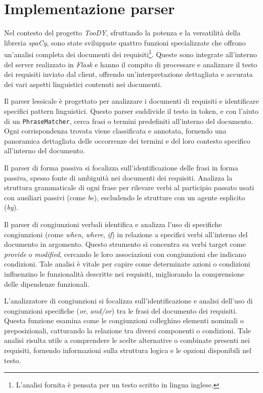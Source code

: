 \documentclass[12pt]{report}
\newcommand{\toody}{\textsl{TooDY}\xspace}
\newcommand{\flask}{\textsl{Flask}\xspace}
\newcommand{\spacy}{\textsl{spaCy}\xspace}
\begin{document}
\section{Implementazione parser}
\label{sec:parser}
Nel contesto del progetto \toody, sfruttando la potenza e la versatilità della libreria \spacy, sono state sviluppate quattro funzioni specializzate che offrono un'analisi completa dei documenti dei requisiti\footnote{L'analisi fornita è pensata per un testo scritto in lingua inglese.}. Queste sono integrate all'interno del server realizzato in \flask e hanno il compito di processare e analizzare il testo dei requisiti inviato dal client, offrendo un'interpretazione dettagliata e accurata dei vari aspetti linguistici contenuti nei documenti.

Il \textsf{parser lessicale} è progettato per analizzare i documenti di requisiti e identificare specifici pattern linguistici. Questo parser suddivide il testo in token, e con l'aiuto di un \texttt{PhraseMatcher}, cerca frasi o termini predefiniti all'interno del documento. Ogni corrispondenza trovata viene classificata e annotata, fornendo una panoramica dettagliata delle occorrenze dei termini e del loro contesto specifico all'interno del documento.

Il \textsf{parser di forma passiva} si focalizza sull'identificazione delle frasi in forma passiva, spesso fonte di ambiguità nei documenti dei requisiti. Analizza la struttura grammaticale di ogni frase per rilevare verbi al participio passato usati con ausiliari passivi (come \textit{be}), escludendo le strutture con un agente esplicito (\textit{by}).

Il \textsf{parser di congiunzioni verbali} identifica e analizza l'uso di specifiche congiunzioni (come \textit{when}, \textit{where}, \textit{if}) in relazione a specifici verbi all'interno del documento in argomento. Questo strumento si concentra su verbi target come \textit{provide} o \textit{modified}, cercando le loro associazioni con congiunzioni che indicano condizioni. Tale analisi è vitale per capire come determinate azioni o condizioni influenzino le funzionalità descritte nei requisiti, migliorando la comprensione delle dipendenze funzionali.

L'\textsf{analizzatore di congiunzioni} si focalizza sull'identificazione e analisi dell'uso di congiunzioni specifiche (\textit{or}, \textit{and/or}) tra le frasi del documento dei requisiti. Questa funzione esamina come le congiunzioni colleghino elementi nominali o preposizionali, catturando la relazione tra diversi componenti o condizioni. Tale analisi risulta utile a comprendere le scelte alternative o combinate presenti nei requisiti, fornendo informazioni sulla struttura logica e le opzioni disponibili nel testo.
\end{document}
